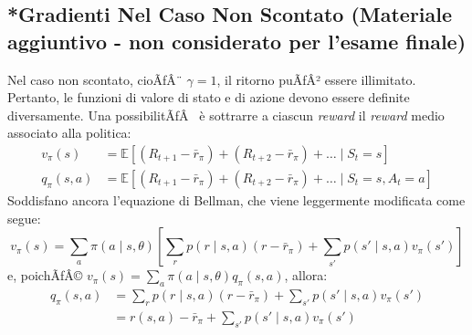﻿\documentclass[11pt, a4paper]{report}
\begin{document}
\begin{center}
\end{center}

\subsection{*Gradienti Nel Caso Non Scontato {\normalfont\small(Materiale aggiuntivo - non considerato per l'esame finale)}}
Nel caso non scontato, cioÃƒÂ¨ $\gamma = 1$, il ritorno puÃƒÂ² essere illimitato. Pertanto, le funzioni di valore di stato e di azione devono essere definite diversamente. Una possibilitÃƒÂ  è sottrarre a ciascun \emph{reward} il \emph{reward} medio associato alla politica:
\begin{align*}
v_{\pi}(s) &= \mathbb{E} [(R_{t+1} - \bar{r}_{\pi}) + (R_{t+2} - \bar{r}_{\pi}) + \dots \mid S_t = s]   \\
q_{\pi}(s, a) &= \mathbb{E} [(R_{t+1} - \bar{r}_{\pi}) + (R_{t+2} - \bar{r}_{\pi}) + \dots \mid S_t = s, A_t = a]
\end{align*}
Soddisfano ancora l'equazione di Bellman, che viene leggermente modificata come segue:
\begin{equation}
v_{\pi}(s) = \sum_a \pi(a \mid s, \theta) \left[ \sum_r p(r \mid s, a)(r - \bar{r}_{\pi}) + \sum_{s'} p(s' \mid s, a) v_{\pi}(s') \right]
\end{equation}
e, poichÃƒÂ© $v_{\pi}(s) = \sum_a \pi(a \mid s, \theta) q_{\pi}(s, a)$, allora:
\begin{align*}
q_{\pi}(s, a) &= \sum_r p(r \mid s, a)(r - \bar{r}_{\pi}) + \sum_{s'} p(s' \mid s, a) v_{\pi}(s') \\
&= r(s, a) - \bar{r}_{\pi} + \sum_{s'} p(s' \mid s, a) v_{\pi}(s')
\end{align*}
\end{document}
